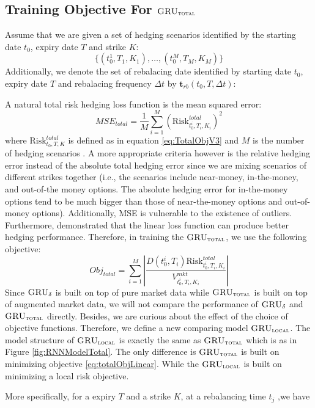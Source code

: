 \documentclass[letterpaper,12pt,titlepage,oneside,final]{book}
\numberwithin{equation}{section}
\theoremstyle{definition}
\newcommand{\model}{\textsc{GRU}_\delta}
\newcommand{\modelT}{\textsc{GRU}_{\textsc{total}}}
\newcommand{\modelL}{\textsc{GRU}_{\textsc{local}}}
\newcommand{\Vmkt}{V^{mkt}}
\begin{document}
\subsection{Training Objective For $\modelT$}
\label{sec:TotalModelObj}
Assume that we are given   a set  of hedging scenarios identified by the starting date $t_0$, expiry date $T$ and strike $K$:
\[
\{(t_0^1,T_1,K_1), \dots, (t_0^M,T_M,K_M)\}	
\]
Additionally, we denote  the set of rebalacing date identified by starting date $t_0$, expiry date $T$ and rebalacing frequency $\Delta t$ by $\mathbf{t}_{rb}(t_0, T,\Delta t)$:


A natural total risk hedging loss function is the mean squared error:
\[
MSE_{total}=\frac{1}{M} \sum_{i=1}^M  (\text{Risk}^{total}_{t_0^i,T_i,K_i})^2
\]
where $\text{Risk}^{total}_{t_0,T,K}$ is defined as in equation \eqref{eq:TotalObjV3} and $M$ is the number of hedging scenarios .
A more appropriate criteria however is the relative hedging error instead of the absolute total hedging error since we are mixing scenarios of different strikes together (i.e., the scenarios include near-money, in-the-money, and out-of-the money options. The absolute hedging error for in-the-money options tend to be much bigger than those of  near-the-money options and out-of-money options). Additionally, MSE is vulnerable to the existence of outliers. Furthermore, \citet{coleman2007total} demonstrated that the linear loss function can produce better hedging performance. Therefore, in training the $\modelT$, we use the following objective:
\begin{equation}
Obj_{total}=\sum_{i=1}^M \left|\frac{D(t_0^i,T_i)  \text{Risk}^{total}_{t_0^i,T_i,K_i}}{\Vmkt_{t^i_0,T_i,K_i}}\right|
\label{eq:totalObjLinear}
\end{equation}
Since $\model$ is built on top of pure market data while $\modelT$ is built on top of augmented market data, we will not compare the performance of  $\model$ and $\modelT$ directly. Besides, we are curious about the effect of the choice of objective functions. Therefore, we define a new comparing model $\modelL$. The model structure of $\modelL$ is exactly the same as  $\modelT$ which is as in Figure \ref{fig:RNNModelTotal}.  The only difference is $\modelT$ is built on minimizing objective \eqref{eq:totalObjLinear}. While the $\modelL$ is built on minimizing a local risk objective.

More specifically, for a expiry $T$ and a strike $K$,  at a rebalancing time $t_j$ ,we have
\end{document}
